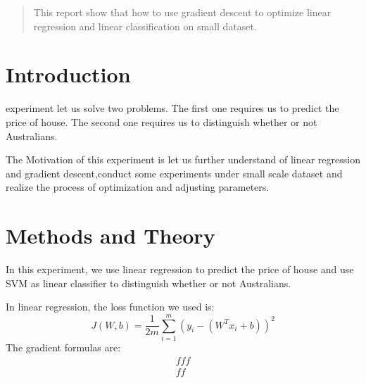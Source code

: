 \documentclass[journal, a4paper]{IEEEtran}
\begin{document}
\begin{abstract}
This report show that how to use gradient descent to optimize linear regression and linear classification on small dataset.
\end{abstract}

\section{Introduction}
 experiment let us solve two problems. 
The first one requires us to predict the price of house. 
The second one requires us to distinguish whether or not Australians.

The Motivation of this experiment is let us further understand of linear regression and gradient descent,conduct some experiments under small scale dataset and realize the process of optimization and adjusting parameters.



\section{Methods and Theory}
In this experiment, we use linear regression to predict the price of house and use SVM as linear classifier to distinguish whether or not Australians.

In linear regression, the loss function we used is:
\begin{equation} \label{eq:linear regression loss function}
    J(W,b) = \frac{1}{2m}\sum_{i=1}^m(y_i-(W^Tx_i+b))^2
\end{equation} 
The gradient formulas are:
\begin{equation} \label{eq:linear regression gradient formula}
    \begin{aligned}
        fff \\
        ff
    \end{aligned}
\end{equation}
\end{document}
